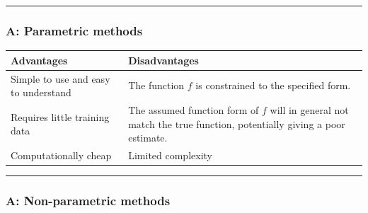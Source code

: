 \documentclass[]{article}
\begin{document}
\begin{center}\rule{0.5\linewidth}{\linethickness}\end{center}

\hypertarget{a-parametric-methods}{%
\subsubsection{A: Parametric methods}\label{a-parametric-methods}}

\begin{longtable}[]{@{}ll@{}}
\toprule
\begin{minipage}[b]{0.47\columnwidth}\raggedright
Advantages\strut
\end{minipage} & \begin{minipage}[b]{0.47\columnwidth}\raggedright
Disadvantages\strut
\end{minipage}\tabularnewline
\midrule
\endhead
\begin{minipage}[t]{0.47\columnwidth}\raggedright
Simple to use and easy to understand\strut
\end{minipage} & \begin{minipage}[t]{0.47\columnwidth}\raggedright
The function \(f\) is constrained to the specified form.\strut
\end{minipage}\tabularnewline
\begin{minipage}[t]{0.47\columnwidth}\raggedright
Requires little training data\strut
\end{minipage} & \begin{minipage}[t]{0.47\columnwidth}\raggedright
The assumed function form of \(f\) will in general not match the true
function, potentially giving a poor estimate.\strut
\end{minipage}\tabularnewline
\begin{minipage}[t]{0.47\columnwidth}\raggedright
Computationally cheap\strut
\end{minipage} & \begin{minipage}[t]{0.47\columnwidth}\raggedright
Limited complexity\strut
\end{minipage}\tabularnewline
\bottomrule
\end{longtable}

\begin{center}\rule{0.5\linewidth}{\linethickness}\end{center}

\hypertarget{a-non-parametric-methods}{%
\subsubsection{A: Non-parametric
methods}\label{a-non-parametric-methods}}
\end{document}
